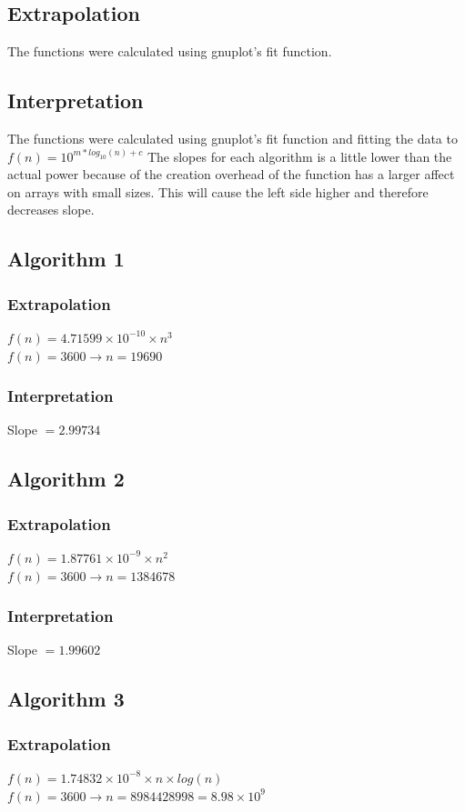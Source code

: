 \documentclass[a4paper,10pt]{article}
\begin{document}
		\subsection{Extrapolation}
			The functions were calculated using gnuplot's fit function.
		\subsection{Interpretation}
			The functions were calculated using gnuplot's fit function and fitting the data to $f(n) = 10^{m * log_{10}(n)+c}$
			The slopes for each algorithm is a little lower than the actual power because of the creation overhead of the function has a larger affect on arrays with small sizes.  This will cause the left side higher and therefore decreases slope.
		\subsection{Algorithm 1}
			\subsubsection{Extrapolation}
				$f(n) = 4.71599 \times 10^{-10} \times n^3$\\
				$f(n) = 3600 \to n = 19690$\\
			\subsubsection{Interpretation}
				Slope $= 2.99734$
		
		\subsection{Algorithm 2}
			\subsubsection{Extrapolation}
				$f(n) = 1.87761 \times 10^{-9} \times n^2$\\
				$f(n) = 3600 \to n = 1384678$
			\subsubsection{Interpretation}
				Slope $= 1.99602$
		\subsection{Algorithm 3}
			\subsubsection{Extrapolation}
				$f(n) = 1.74832 \times 10^{-8} \times n \times log(n)$\\
				$f(n) = 3600 \to n = 8984428998 =8.98 \times 10^9$
\end{document}
